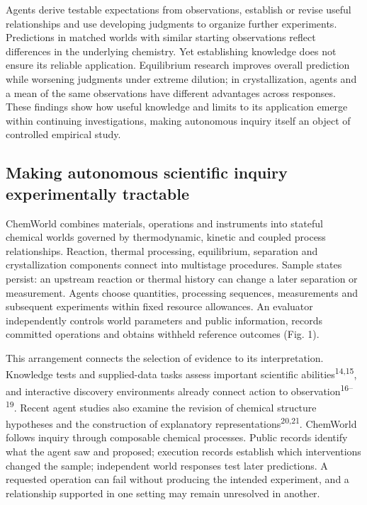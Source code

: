 \documentclass[10pt,a4paper]{article}
\begin{document}
Agents derive testable expectations from observations, establish or revise useful relationships and use developing judgments to organize further experiments. Predictions in matched worlds with similar starting observations reflect differences in the underlying chemistry. Yet establishing knowledge does not ensure its reliable application. Equilibrium research improves overall prediction while worsening judgments under extreme dilution; in crystallization, agents and a mean of the same observations have different advantages across responses. These findings show how useful knowledge and limits to its application emerge within continuing investigations, making autonomous inquiry itself an object of controlled empirical study.

\subsection{Making autonomous scientific inquiry experimentally tractable}\label{making-autonomous-scientific-inquiry-experimentally-tractable}

ChemWorld combines materials, operations and instruments into stateful chemical worlds governed by thermodynamic, kinetic and coupled process relationships. Reaction, thermal processing, equilibrium, separation and crystallization components connect into multistage procedures. Sample states persist: an upstream reaction or thermal history can change a later separation or measurement. Agents choose quantities, processing sequences, measurements and subsequent experiments within fixed resource allowances. An evaluator independently controls world parameters and public information, records committed operations and obtains withheld reference outcomes (Fig. 1).

This arrangement connects the selection of evidence to its interpretation. Knowledge tests and supplied-data tasks assess important scientific abilities\textsuperscript{14,15}, and interactive discovery environments already connect action to observation\textsuperscript{16--19}. Recent agent studies also examine the revision of chemical structure hypotheses and the construction of explanatory representations\textsuperscript{20,21}. ChemWorld follows inquiry through composable chemical processes. Public records identify what the agent saw and proposed; execution records establish which interventions changed the sample; independent world responses test later predictions. A requested operation can fail without producing the intended experiment, and a relationship supported in one setting may remain unresolved in another.
\end{document}
